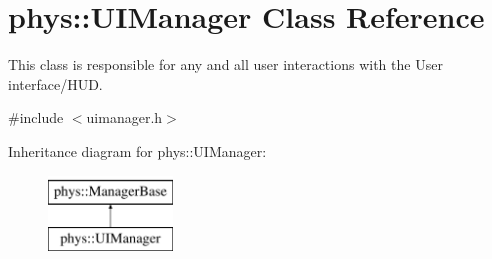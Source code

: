 \hypertarget{classphys_1_1UIManager}{
\section{phys::UIManager Class Reference}
\label{d5/dc5/classphys_1_1UIManager}
}


This class is responsible for any and all user interactions with the User interface/HUD.  




{\ttfamily \#include $<$uimanager.h$>$}

Inheritance diagram for phys::UIManager:\begin{figure}[H]
\begin{center}
\leavevmode
\includegraphics[height=2cm]{d5/dc5/classphys_1_1UIManager}
\end{center}
\end{figure}
